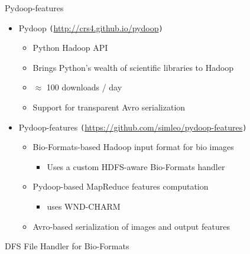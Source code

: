 \documentclass[compress]{beamer}
\newcommand{\urlref}[1]{{\small \texttt{(}{\color{blue}\url{#1}}\texttt{)}}}
\begin{document}
\begin{frame}{Pydoop-features}
  \begin{center}
    \begin{itemize}
    \item Pydoop \urlref{http://crs4.github.io/pydoop}
      \begin{itemize}
      \item Python Hadoop API
      \item Brings Python's wealth of scientific libraries to Hadoop
      \item $\approx$ 100 downloads / day
      \item Support for transparent Avro serialization
      \end{itemize}
    \item Pydoop-features \urlref{https://github.com/simleo/pydoop-features}
      \begin{itemize}
      \item Bio-Formats-based Hadoop input format for bio images
        \begin{itemize}
        \item Uses a custom HDFS-aware Bio-Formats handler
        \end{itemize}
      \item Pydoop-based MapReduce features computation
        \begin{itemize}
        \item uses WND-CHARM
        \end{itemize}
      \item Avro-based serialization of images and output features

      \end{itemize}
    \end{itemize}
  \end{center}
\end{frame}

\begin{frame}{DFS File Handler for Bio-Formats}
  \begin{center}
  \end{center}
\end{frame}
\end{document}
